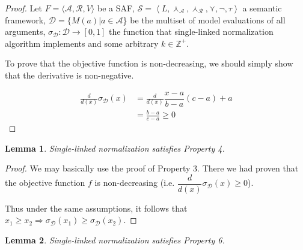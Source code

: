 \documentclass{article}
\newtheorem{lemma}{Lemma}
\newcommand{\args}{\mathcal{A}} %
\newcommand{\att}{\mathcal{R}}  %
\newcommand{\valueset}{L}
\newcommand{\safid}{F}               %
\newcommand{\saf}{\safid = \safbody} %
\newcommand{\safbody}{\langle \args, \att, V \rangle} %
\newcommand{\sembodyNew}{\left\langle \valueset,\SAFand_\mathcal{A}, \SAFand_\mathcal{R},\SAFor,\lnot,\tau \right\rangle} %
\newcommand{\SAFand}{\curlywedge}     %
\newcommand{\SAFor}{\curlyvee}        %
\newcommand{\sem}{\mathcal{S}}
\newcommand{\dataset}{\mathcal{D}}   %
\begin{document}
\begin{proof}
Let $\saf$ be a SAF, $\sem = \sembodyNew$ a semantic framework, $\dataset = \{M(a)|a \in \args$\} be the multiset of model evaluations of all arguments, $\sigma_{\dataset}: \dataset  \rightarrow  [0,1]$ the function that single-linked normalization algorithm implements and some arbitrary $k \in \mathbb{Z}^{+}$.

To prove that the objective function is non-decreasing, we should simply show that the derivative is non-negative.

\begin{align*}
  \frac{d}{d(x)} \sigma_{\dataset}(x)
  &= \frac{d}{d(x)} \dfrac{x-a}{b-a} (c-a) + a
 \\ &=  \frac{b-a}{c-a} \geq 0               \>                 \tag{$1 \geq c \geq b \geq a \geq 0$}
\end{align*}

\end{proof}

\begin{lemma}
Single-linked normalization satisfies Property 4.
\end{lemma}

\begin{proof}
We may basically use the proof of Property 3. There we had proven that the objective function $f$ is non-decreasing (i.e. $\dfrac{d}{d(x)} \sigma_{\dataset}(x) \geq 0$).

Thus under the same assumptions, it follows that  $x_1 \geq x_2 \Longrightarrow \sigma_{\dataset}(x_1) \geq \sigma_{\dataset}(x_2)$.

\end{proof}


\begin{lemma}
Single-linked normalization satisfies Property 6.
\end{lemma}
\end{document}
